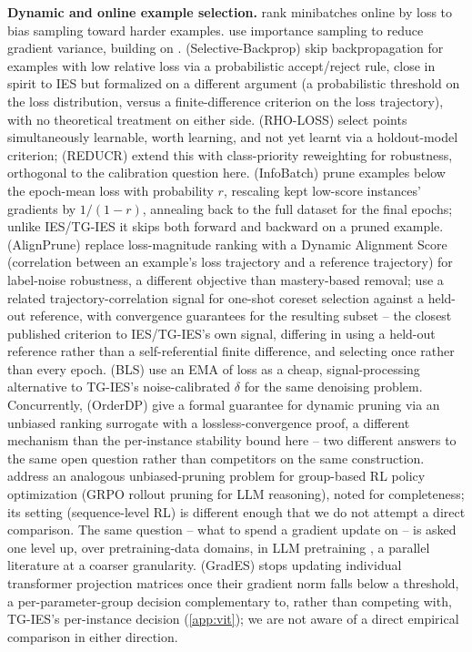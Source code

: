 \documentclass{article}
\theoremstyle{plain}
\theoremstyle{definition}
\theoremstyle{remark}
\begin{document}
\textbf{Dynamic and online example selection.} \citet{loshchilov2015online} rank minibatches online by loss to bias sampling toward harder examples. \citet{katharopoulos2018not} use importance sampling to reduce gradient variance, building on \citet{needell2014stochastic}. \citet{jiang2019accelerating} (Selective-Backprop) skip backpropagation for examples with low relative loss via a probabilistic accept/reject rule, close in spirit to IES but formalized on a different argument (a probabilistic threshold on the loss distribution, versus a finite-difference criterion on the loss trajectory), with no theoretical treatment on either side. \citet{mindermann2022prioritized} (RHO-LOSS) select points simultaneously learnable, worth learning, and not yet learnt via a holdout-model criterion; \citet{bankes2024reducr} (REDUCR) extend this with class-priority reweighting for robustness, orthogonal to the calibration question here. \citet{qin2024infobatch} (InfoBatch) prune examples below the epoch-mean loss with probability $r$, rescaling kept low-score instances' gradients by $1/(1-r)$, annealing back to the full dataset for the final epochs; unlike IES/TG-IES it skips both forward and backward on a pruned example. \citet{qin2026alignprune} (AlignPrune) replace loss-magnitude ranking with a Dynamic Alignment Score (correlation between an example's loss trajectory and a reference trajectory) for label-noise robustness, a different objective than mastery-based removal; \citet{nagaraj2025coresets} use a related trajectory-correlation signal for one-shot coreset selection against a held-out reference, with convergence guarantees for the resulting subset -- the closest published criterion to IES/TG-IES's own signal, differing in using a held-out reference rather than a self-referential finite difference, and selecting once rather than every epoch. \citet{zhou2026bls} (BLS) use an EMA of loss as a cheap, signal-processing alternative to TG-IES's noise-calibrated $\delta$ for the same denoising problem. Concurrently, \citet{jin2026orderdp} (OrderDP) give a formal guarantee for dynamic pruning via an unbiased ranking surrogate with a lossless-convergence proof, a different mechanism than the per-instance stability bound here -- two different answers to the same open question rather than competitors on the same construction. \citet{zhu2026dppo} address an analogous unbiased-pruning problem for group-based RL policy optimization (GRPO rollout pruning for LLM reasoning), noted for completeness; its setting (sequence-level RL) is different enough that we do not attempt a direct comparison. The same question -- what to spend a gradient update on -- is asked one level up, over pretraining-data domains, in LLM pretraining \citep{xie2023doremi}, a parallel literature at a coarser granularity. \citet{wen2025grades} (GradES) stops updating individual transformer projection matrices once their gradient norm falls below a threshold, a per-parameter-group decision complementary to, rather than competing with, TG-IES's per-instance decision (\cref{app:vit}); we are not aware of a direct empirical comparison in either direction.
\end{document}
